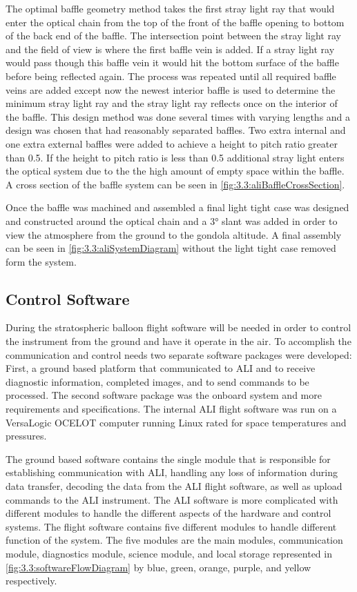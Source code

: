 The optimal baffle geometry method takes the first stray light ray that would enter the optical chain from the top of the front of the baffle opening to bottom of the back end of the baffle. The intersection point between the stray light ray and the field of view is where the first baffle vein is added. If a stray light ray would pass though this baffle vein it would hit the bottom surface of the baffle before being reflected again. The process was repeated until all required baffle veins are added except now the newest interior baffle is used to determine the minimum stray light ray and the stray light ray reflects once on the interior of the baffle. This design method was done several times with varying lengths and a design was chosen
that had reasonably separated baffles. Two extra internal and one extra external baffles were added to achieve a height to pitch ratio greater than 0.5. If the height to pitch ratio is less than 0.5 additional stray light enters the optical system due to the the high amount of empty space within the baffle. A cross section of the baffle system can be seen in \autoref{fig:3.3:aliBaffleCrossSection}. 

Once the baffle was machined and assembled a final light tight case was designed and constructed around the optical chain and a 3\si{\degree} slant was added in order to view the atmosphere from the ground to the gondola altitude. A final assembly can be seen in \autoref{fig:3.3:aliSystemDiagram} without the light tight case removed form the system.

\subsection{Control Software}

During the stratospheric balloon flight software will be needed in order to control the instrument from the ground and have it operate in the air. To accomplish the communication and control needs two separate software packages were developed: First, a ground based platform that communicated to ALI and to receive diagnostic information, completed images, and to send commands to be processed. The second software package was the onboard system and more requirements and specifications. The internal ALI flight software was run on a VersaLogic OCELOT computer running Linux rated for space temperatures and pressures.

The ground based software contains the single module that is responsible for establishing communication with ALI, handling any loss of information during data transfer, decoding the data from the ALI flight software, as well as upload commands to the ALI instrument. The ALI software is more complicated with different modules to handle the different aspects of the hardware and control systems. The flight software contains five different modules to handle different function of the system. The five modules are the main modules, communication module, diagnostics module, science module, and local storage represented in \autoref{fig:3.3:softwareFlowDiagram} by blue, green, orange, purple, and yellow respectively.

